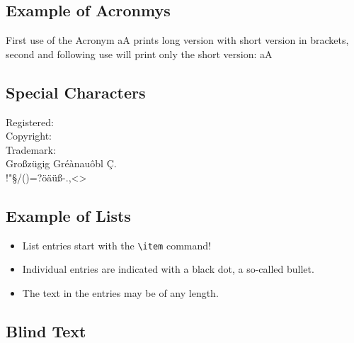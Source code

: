 \documentclass[class=scrbook, crop=false]{standalone}
\begin{document}
    \subsection{Example of Acronmys}
    First use of the Acronym \gls{aA} prints long version with short version in brackets, second and following use will print only the short version: \gls{aA}
    
    \subsection{Special Characters}
    Registered: \TReg\\
    Copyright: \TCop\\
    Trademark: \TTra\\
    
    Großzügig Gréànauôbl Ç.\\
    !"§/()=?öäüß-.,<>\\
    
    \subsection{Example of Lists}
    \begin{itemize}
      \item List entries start with the \verb|\item| command!
      \item Individual entries are indicated with a black dot, a so-called bullet.
      \item The text in the entries may be of any length.
    \end{itemize}
    
    \subsection{Blind Text}
    \Blindtext
    
\end{document}
